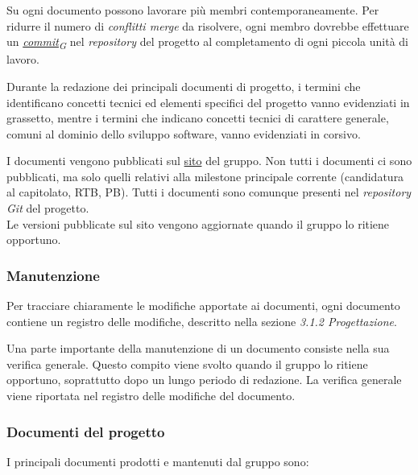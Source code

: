 \documentclass[12pt, a4paper]{article}
\newcommand{\urlglossario}{https://skynetunigroup.github.io/Code_Guardian/Documentazione/RTB/glossario_v1.0.0.pdf} %
\newcommand{\glo}[2]{\href{\urlglossario\#nameddest=#2}{#1\textsubscript{G}}}
\begin{document}
Su ogni documento possono lavorare più membri contemporaneamente. Per ridurre il numero di \textit{conflitti merge} da risolvere, ogni membro dovrebbe effettuare un \textit{\glo{commit}{commit}} nel \textit{repository} del progetto al completamento di ogni piccola unità di lavoro.

Durante la redazione dei principali documenti di progetto, i termini che identificano concetti tecnici ed elementi specifici del progetto vanno evidenziati in grassetto, mentre i termini che indicano concetti tecnici di carattere generale, comuni al dominio dello sviluppo software, vanno evidenziati in corsivo.

I documenti vengono pubblicati sul \href{https://skynetunigroup.github.io/Code_Guardian/}{sito} del gruppo. Non tutti i documenti ci sono pubblicati, ma solo quelli relativi alla milestone principale corrente (candidatura al capitolato, RTB, PB). Tutti i documenti sono comunque presenti nel \textit{repository} \textit{Git} del progetto.\\
Le versioni pubblicate sul sito vengono aggiornate quando il gruppo lo ritiene opportuno.

\subsubsection{Manutenzione}

Per tracciare chiaramente le modifiche apportate ai documenti, ogni documento contiene un registro delle modifiche, descritto nella sezione \textit{3.1.2 Progettazione}.

Una parte importante della manutenzione di un documento consiste nella sua verifica generale. Questo compito viene svolto quando il gruppo lo ritiene opportuno, soprattutto dopo un lungo periodo di redazione. La verifica generale viene riportata nel registro delle modifiche del documento.

\subsubsection{Documenti del progetto}

I principali documenti prodotti e mantenuti dal gruppo sono:
\end{document}
